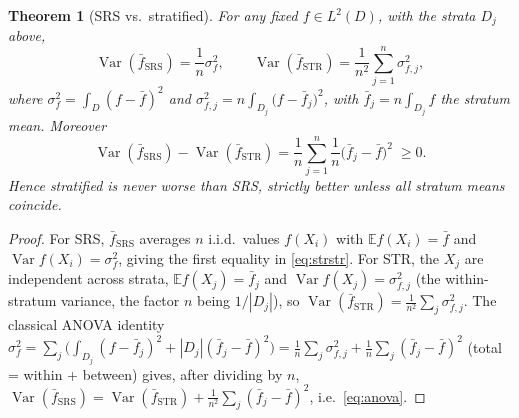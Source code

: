 \documentclass{amsart}
\newtheorem{theorem}{Theorem}
\theoremstyle{definition}
\newcommand{\E}{\mathbb{E}}
\newcommand{\Var}{\operatorname{Var}}
\begin{document}
\begin{theorem}[SRS vs.\ stratified]\label{thm:srsstr}
For any fixed $f\in L^2(D)$, with the strata $D_j$ above,
\begin{equation}\label{eq:strstr}
\Var(\bar f_{\mathrm{SRS}})=\frac{1}{n}\sigma_f^2,\qquad
\Var(\bar f_{\mathrm{STR}})
=\frac1{n^2}\sum_{j=1}^n \sigma_{f,j}^2,
\end{equation}
where $\sigma_f^2=\int_D (f-\bar f)^2$ and
$\sigma_{f,j}^2=n\int_{D_j}\!\big(f-\bar f_j\big)^2$, with
$\bar f_j=n\int_{D_j}f$ the stratum mean. Moreover
\begin{equation}\label{eq:anova}
\Var(\bar f_{\mathrm{SRS}})-\Var(\bar f_{\mathrm{STR}})
=\frac1n\sum_{j=1}^n \frac1n\big(\bar f_j-\bar f\big)^2\;\ge0 .
\end{equation}
Hence stratified is never worse than SRS, strictly better unless all
stratum means coincide.
\end{theorem}
\begin{proof}
For SRS, $\bar f_{\mathrm{SRS}}$ averages $n$ i.i.d.\ values $f(X_i)$ with
$\E f(X_i)=\bar f$ and $\Var f(X_i)=\sigma_f^2$, giving the first equality
in \eqref{eq:strstr}. For STR, the $X_j$ are independent across strata,
$\E f(X_j)=\bar f_j$ and $\Var f(X_j)=\sigma_{f,j}^2$ (the within-stratum
variance, the factor $n$ being $1/|D_j|$), so
$\Var(\bar f_{\mathrm{STR}})=\frac1{n^2}\sum_j\sigma_{f,j}^2$. The
classical ANOVA identity
$\sigma_f^2=\sum_j\big(\int_{D_j}(f-\bar f_j)^2 + |D_j|(\bar f_j-\bar
f)^2\big)
=\frac1n\sum_j\sigma_{f,j}^2+\frac1n\sum_j(\bar f_j-\bar f)^2$ (total =
within + between) gives, after dividing by $n$,
$\Var(\bar f_{\mathrm{SRS}})=\Var(\bar f_{\mathrm{STR}})
+\frac1{n^2}\sum_j(\bar f_j-\bar f)^2$, i.e.\ \eqref{eq:anova}.
\end{proof}
\end{document}
